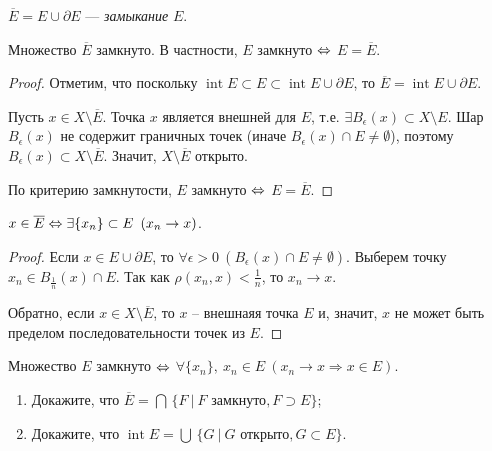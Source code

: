 \begin{definition}
    $\overline{E} = E \cup \partial E$ --- \emph{замыкание} $E$.
\end{definition}

\begin{lemma}
    Множество $\overline{E}$ замкнуто. В частности, $E$ замкнуто $\Leftrightarrow$ $E = \overline{E}$.

    \begin{proof}
        Отметим, что поскольку $\operatorname{int} E \subset E \subset \operatorname{int} E \cup \partial E$, то $\overline{E} = \operatorname{int} E \cup \partial E$.

        Пусть $x \in X \setminus \overline{E}$. Точка $x$ является внешней для $E$, т.е. $\exists B_{\epsilon}(x) \subset X \setminus E$. Шар $B_{\epsilon}(x)$ не содержит граничных точек (иначе $B_{\epsilon}(x) \cap E \neq \emptyset$), поэтому $B_{\epsilon}(x) \subset X \setminus \overline{E}$. Значит, $X \setminus \overline{E}$ открыто.

        По критерию замкнутости, $E$ замкнуто $\Leftrightarrow$ $E = \overline{E}$.
    \end{proof}
\end{lemma}

\begin{note}
    $x \in \overline{E} \Leftrightarrow \exists \{x_{n}\} \subset E \ \left(x_{n} \to x\right)$.
\end{note}

\begin{proof}
    Если $x \in E \cup \partial E$, то $\forall \epsilon > 0 \ (B_{\epsilon}(x) \cap E \neq \emptyset)$. Выберем точку $x_{n} \in B_{\frac{1}{n}}(x) \cap E$. Так как $\rho(x_{n}, x) < \frac{1}{n}$, то $x_{n} \to x$.

    Обратно, если $x \in X \setminus \overline{E}$, то $x$ -- внешнаяя точка $E$ и, значит, $x$ не может быть пределом последовательности точек из $E$.
\end{proof}

\begin{corollary}
    Множество $E$ замкнуто $\Leftrightarrow$ $\forall \{x_{n}\}, \ x_{n} \in E \ \left(x_{n} \to x \Rightarrow x \in E\right)$.
\end{corollary}

\begin{problem}
    \begin{enumerate}
        \item Докажите, что $\overline{E} = \bigcap \, \{F \ | \ F \text{ замкнуто}, F \supset E\}$;
        \item Докажите, что $\operatorname{int} E = \bigcup \, \{G \ | \ G \text{ открыто}, G \subset E\}$.
    \end{enumerate}
\end{problem}